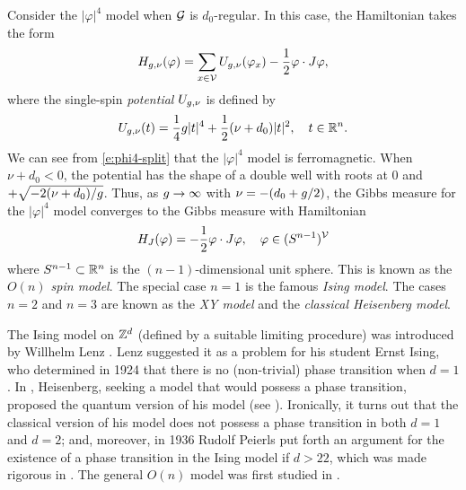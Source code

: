 Consider the $|\varphi|^4$ model when $\mathcal{G}$ is $d_0$-regular. In this case,
the Hamiltonian takes the form
\begin{equation}
\label{e:phi4-split}
H_{g,\nu}(\varphi)
  =
\sum_{x\in\mathcal{V}} U_{g,\nu}(\varphi_x) - \frac{1}{2} \varphi \cdot J \varphi,
\end{equation}
where the single-spin \emph{potential} $U_{g,\nu}$ is defined by
\begin{equation}
U_{g,\nu}(t)
	=
\frac{1}{4} g |t|^4
	+
\frac{1}{2} (\nu + d_0) |t|^2,
	\quad
t \in {\mathbb R}^n.
\end{equation}
We can see from \eqref{e:phi4-split} that the $|\varphi|^4$ model is ferromagnetic.
When $\nu + d_0 < 0$, the potential has the shape of a double well with roots at $0$
and $+\sqrt{-2 (\nu + d_0) / g}$.
Thus, as $g\rightarrow\infty$ with $\nu = -(d_0 + g/2)$, the Gibbs measure for the
$|\varphi|^4$ model converges to the Gibbs measure with Hamiltonian
\begin{equation}
\label{e:on-model}
H_J(\varphi) = -\frac12 \varphi \cdot J \varphi,
	\quad
\varphi \in (S^{n-1})^{\mathcal{V}}
\end{equation}
where $S^{n-1} \subset {\mathbb R}^n$ is the $(n-1)$-dimensional unit sphere.
This is known as the \emph{$O(n)$ spin model}. The special case $n = 1$ is the
famous \emph{Ising model}. The cases $n = 2$ and $n = 3$ are known as the
\emph{XY model} and the \emph{classical Heisenberg model}.

\begin{rk}
The Ising model on ${ {{\mathbb Z}}^d }$ (defined by a suitable limiting procedure) was introduced
by Willhelm Lenz \cite{Lenz20}. Lenz
suggested it as a problem for his student Ernst Ising, who determined in 1924
\cite{Ising25} that there is no (non-trivial) phase transition when $d = 1$.
In \cite{Heisenberg28}, Heisenberg, seeking a model that would possess a phase transition,
proposed the quantum version of his model (see \cite{Brush67}).
Ironically, it turns out that the classical version of his model does not possess a phase
transition in both $d = 1$ and $d = 2$; and, moreover, in 1936
Rudolf Peierls \cite{Peierls36} put forth an argument for the existence of a phase transition
in the Ising model if $d >2 2$, which was made rigorous in \cite{Griffiths64}.
The general $O(n)$ model was first studied in \cite{Stanley68}.
\end{rk}

